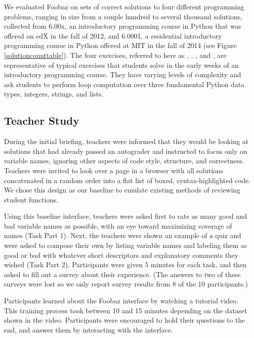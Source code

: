 We evaluated Foobaz on sets of correct solutions to four different programming problems, ranging in size from a couple hundred to several thousand solutions, collected from 6.00x, an introductory programming course in Python that was offered on edX in the fall of 2012, and 6.0001, a residential introductory programming course in Python offered at MIT in the fall of 2014 (see Figure \ref{solutioncounttable}). The four exercises, referred to here as , , , and , are representative of typical exercises that students solve in the early weeks of an introductory programming course. They have varying levels of complexity and ask students to perform loop computation over three fundamental Python data types, integers, strings, and lists.

\subsection{Teacher Study}

During the initial briefing, teachers were informed that they would be looking at solutions that had already passed an autograder and instructed to focus only on variable names, ignoring other aspects of code style, structure, and correctness. Teachers were invited to look over a page in a browser with all solutions concatenated in a random order into a flat list of boxed, syntax-highlighted code. We chose this design as our baseline to emulate existing methods of reviewing student functions. 

Using this baseline interface, teachers were asked first to rate as many good and bad variable names as possible, with an eye toward maximizing coverage of names (Task Part 1). Next, the teachers were shown an example of a quiz and were asked to compose their own by listing variable names and labeling them as good or bad with whatever short descriptors and explanatory comments they wished (Task Part 2). Participants were given 5 minutes for each task, and then asked to fill out a survey about their experience. (The answers to two of these surveys were lost so we only report survey results from 8 of the 10 participants.)

Participants learned about the Foobaz interface by watching a tutorial video. This training process took between 10 and 15 minutes depending on the dataset shown in the video. Participants were encouraged to hold their questions to the end, and answer them by interacting with the interface. 

